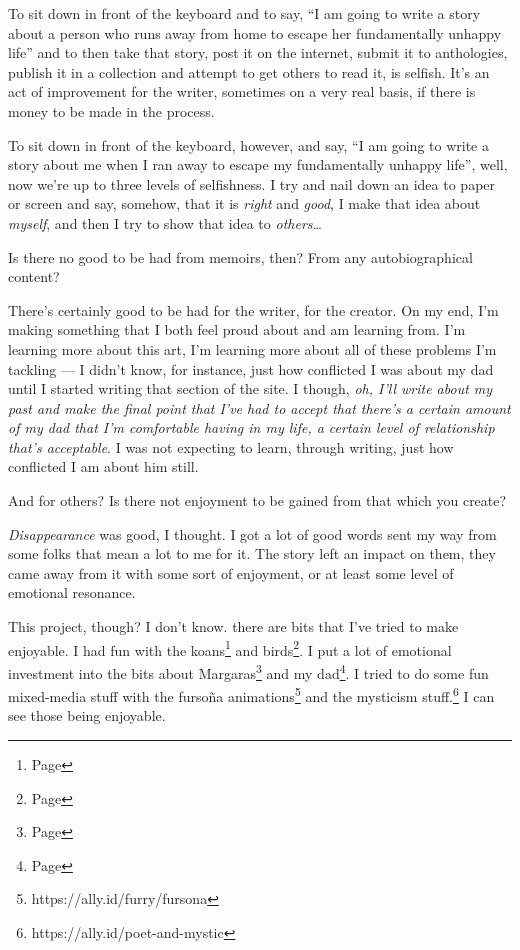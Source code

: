 \begin{paracol}{2}
\begin{leftcolumn}
To sit down in front of the keyboard and to say, ``I am going to write a story about a person who runs away from home to escape her fundamentally unhappy life'' and to then take that story, post it on the internet, submit it to anthologies, publish it in a collection and attempt to get others to read it, is selfish. It's an act of improvement for the writer, sometimes on a very real basis, if there is money to be made in the process.

To sit down in front of the keyboard, however, and say, ``I am going to write a story about me when I ran away to escape my fundamentally unhappy life'', well, now we're up to three levels of selfishness. I try and nail down an idea to paper or screen and say, somehow, that it is \emph{right} and \emph{good}, I make that idea about \emph{myself}, and then I try to show that idea to \emph{others}\ldots{}

\begin{ally}
Is there no good to be had from memoirs, then? From any autobiographical content?
\end{ally}
There's certainly good to be had for the writer, for the creator. On my end, I'm making something that I both feel proud about and am learning from. I'm learning more about this art, I'm learning more about all of these problems I'm tackling --- I didn't know, for instance, just how conflicted I was about my dad until I started writing that section of the site. I though, \emph{oh, I'll write about my past and make the final point that I've had to accept that there's a certain amount of my dad that I'm comfortable having in my life, a certain level of relationship that's acceptable}. I was not expecting to learn, through writing, just how conflicted I am about him still.

\begin{ally}
And for others? Is there not enjoyment to be gained from that which you create?
\end{ally}
\emph{Disappearance} was good, I thought. I got a lot of good words sent my way from some folks that mean a lot to me for it. The story left an impact on them, they came away from it with some sort of enjoyment, or at least some level of emotional resonance.

This project, though? I don't know. there are bits that I've tried to make enjoyable. I had fun with the koans\footnote{Page \pageref{koan}} and birds\footnote{Page \pageref{birds}}. I put a lot of emotional investment into the bits about Margaras\footnote{Page \pageref{furry:margaras}} and my dad\footnote{Page \pageref{dad}}. I tried to do some fun mixed-media stuff with the fursoña animations\footnote{https://ally.id/furry/fursona} and the mysticism stuff.\footnote{https://ally.id/poet-and-mystic} I can see those being enjoyable.


\end{leftcolumn}
\end{paracol}
